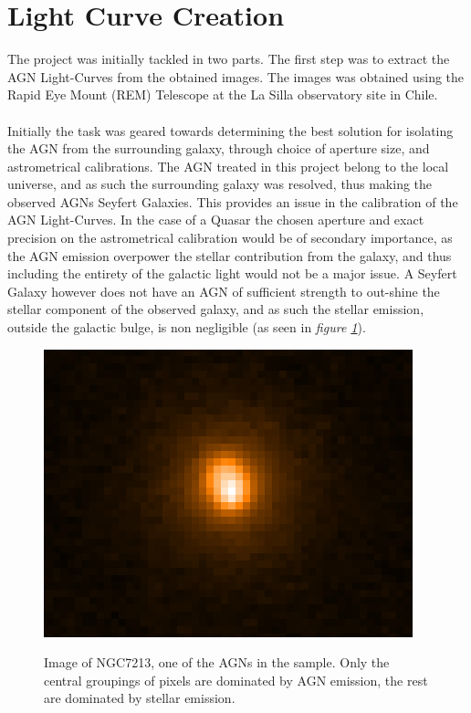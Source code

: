 \documentclass[a4paper, 12pt, twoside]{article}
\begin{document}
\section{Light Curve Creation}
The project was initially tackled in two parts. The first step was to extract the AGN Light-Curves from the obtained images. The images was obtained using the Rapid Eye Mount (REM) Telescope at the La Silla observatory site in Chile. \\
\\
Initially the task was geared towards determining the best solution for isolating the AGN from the surrounding galaxy, through choice of aperture size, and astrometrical calibrations. The AGN treated in this project belong to the local universe, and as such the surrounding galaxy was resolved, thus making the observed AGNs Seyfert Galaxies. This provides an issue in the calibration of the AGN Light-Curves. In the case of a Quasar the chosen aperture and exact precision on the astrometrical calibration would be of secondary importance, as the AGN emission overpower the stellar contribution from the galaxy, and thus including the entirety of the galactic light would not be a major issue. A Seyfert Galaxy however does not have an AGN of sufficient strength to out-shine the stellar component of the observed galaxy, and as such the stellar emission, outside the galactic bulge, is non negligible (as seen in \emph{figure \ref{fig:NGC7213}}).
\begin{figure}[t!]
\centering
\includegraphics[width=0.8\linewidth]{Figure/NGC7213.png}\\
\caption{Image of NGC7213, one of the AGNs in the sample. Only the central groupings of pixels are dominated by AGN emission, the rest are dominated by stellar emission.}
\label{fig:NGC7213}
\end{figure}
\end{document}
